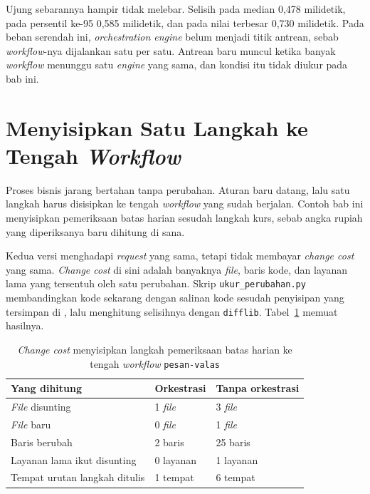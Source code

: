 Ujung sebarannya hampir tidak melebar. Selisih pada median 0,478 milidetik,
pada persentil ke-95 0,585 milidetik, dan pada nilai terbesar
0,730 milidetik.
Pada beban serendah ini, \textit{orchestration engine} belum menjadi titik
antrean, sebab \textit{workflow}-nya dijalankan satu per satu. Antrean baru
muncul ketika banyak \textit{workflow} menunggu satu \textit{engine} yang sama,
dan kondisi itu tidak diukur pada bab ini.

\section{Menyisipkan Satu Langkah ke Tengah \textit{Workflow}}

Proses bisnis jarang bertahan tanpa perubahan. Aturan baru datang, lalu satu
langkah harus disisipkan ke tengah \textit{workflow} yang sudah berjalan. Contoh bab
ini menyisipkan pemeriksaan batas harian sesudah langkah kurs, sebab angka
rupiah yang diperiksanya baru dihitung di sana.

Kedua versi menghadapi \textit{request} yang sama, tetapi tidak membayar
\textit{change cost} yang sama.
\textit{Change cost} di sini adalah banyaknya \textit{file}, baris kode, dan
layanan lama yang tersentuh oleh satu perubahan. Skrip
\texttt{ukur\_perubahan.py} membandingkan kode sekarang dengan salinan kode
sesudah penyisipan yang tersimpan di , lalu
menghitung selisihnya dengan \texttt{difflib}.
Tabel~\ref{tab:biaya-perubahan} memuat hasilnya.

\begin{table}[htbp]
  \centering
  \caption{\textit{Change cost} menyisipkan langkah pemeriksaan batas harian
    ke tengah \textit{workflow} \texttt{pesan-valas}}
  \label{tab:biaya-perubahan}
  \begin{tabularx}{\textwidth}{|X|l|l|}
    \hline
    \textbf{Yang dihitung} & \textbf{Orkestrasi} & \textbf{Tanpa orkestrasi} \\
    \hline
    \textit{File} disunting & 1 \textit{file} & 3 \textit{file} \\
    \hline
    \textit{File} baru & 0 \textit{file} & 1 \textit{file} \\
    \hline
    Baris berubah & 2 baris & 25 baris \\
    \hline
    Layanan lama ikut disunting & 0 layanan & 1 layanan \\
    \hline
    Tempat urutan langkah ditulis & 1 tempat & 6 tempat \\
    \hline
  \end{tabularx}
\end{table}

